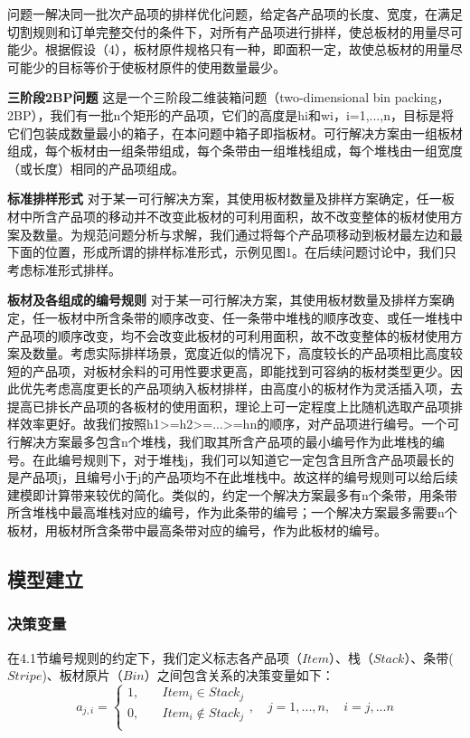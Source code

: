 \documentclass[bwprint]{gmcmthesis}
\begin{document}
问题一解决同一批次产品项的排样优化问题，给定各产品项的长度、宽度，在满足切割规则和订单完整交付的条件下，对所有产品项进行排样，使总板材的用量尽可能少。根据假设（4），板材原件规格只有一种，即面积一定，故使总板材的用量尽可能少的目标等价于使板材原件的使用数量最少。

\textbf{三阶段2BP问题} \quad 这是一个三阶段二维装箱问题（two-dimensional bin packing，2BP），我们有一批n个矩形的产品项，它们的高度是hi和wi，i=1,...,n，目标是将它们包装成数量最小的箱子，在本问题中箱子即指板材。可行解决方案由一组板材组成，每个板材由一组条带组成，每个条带由一组堆栈组成，每个堆栈由一组宽度（或长度）相同的产品项组成。

\textbf{标准排样形式} \quad 对于某一可行解决方案，其使用板材数量及排样方案确定，任一板材中所含产品项的移动并不改变此板材的可利用面积，故不改变整体的板材使用方案及数量。为规范问题分析与求解，我们通过将每个产品项移动到板材最左边和最下面的位置，形成所谓的排样标准形式，示例见图1。在后续问题讨论中，我们只考虑标准形式排样。

\textbf{板材及各组成的编号规则} \quad 对于某一可行解决方案，其使用板材数量及排样方案确定，任一板材中所含条带的顺序改变、任一条带中堆栈的顺序改变、或任一堆栈中产品项的顺序改变，均不会改变此板材的可利用面积，故不改变整体的板材使用方案及数量。考虑实际排样场景，宽度近似的情况下，高度较长的产品项相比高度较短的产品项，对板材余料的可用性要求更高，即能找到可容纳的板材类型更少。因此优先考虑高度更长的产品项纳入板材排样，由高度小的板材作为灵活插入项，去提高已排长产品项的各板材的使用面积，理论上可一定程度上比随机选取产品项排样效率更好。故我们按照h1>=h2>=...>=hn的顺序，对产品项进行编号。一个可行解决方案最多包含n个堆栈，我们取其所含产品项的最小编号作为此堆栈的编号。在此编号规则下，对于堆栈j，我们可以知道它一定包含且所含产品项最长的是产品项j，且编号小于j的产品项均不在此堆栈中。故这样的编号规则可以给后续建模即计算带来较优的简化。类似的，约定一个解决方案最多有n个条带，用条带所含堆栈中最高堆栈对应的编号，作为此条带的编号；一个解决方案最多需要n个板材，用板材所含条带中最高条带对应的编号，作为此板材的编号。


\subsection{模型建立}

\subsubsection{决策变量}
在4.1节编号规则的约定下，我们定义标志各产品项（$Item$）、栈（$Stack$）、条带($Stripe$)、板材原片（$Bin$）之间包含关系的决策变量如下：
\begin{equation}   %
    a_{j,i}=
    \begin{cases}
        1, \quad  & Item_i \in  Stack_j \\
        0,\quad  & Item_i  \notin  Stack_j \\
    \end{cases},\quad j=1,...,n, \quad i=j,...n  
\end{equation}
\end{document}

